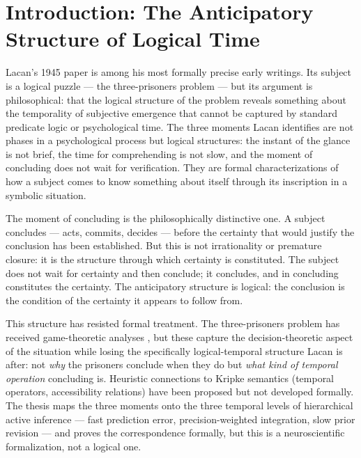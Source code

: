\documentclass[12pt]{article}
\theoremstyle{definition}
\theoremstyle{remark}
\begin{document}
\vspace{1em}

\section{Introduction: The Anticipatory Structure of Logical Time}

Lacan's 1945 paper is among his most formally precise early writings. Its subject is a logical puzzle --- the three-prisoners problem --- but its argument is philosophical: that the logical structure of the problem reveals something about the temporality of subjective emergence that cannot be captured by standard predicate logic or psychological time. The three moments Lacan identifies are not phases in a psychological process but logical structures: the instant of the glance is not brief, the time for comprehending is not slow, and the moment of concluding does not wait for verification. They are formal characterizations of how a subject comes to know something about itself through its inscription in a symbolic situation.

The moment of concluding is the philosophically distinctive one. A subject concludes --- acts, commits, decides --- before the certainty that would justify the conclusion has been established. But this is not irrationality or premature closure: it is the structure through which certainty is constituted. The subject does not wait for certainty and then conclude; it concludes, and in concluding constitutes the certainty. The anticipatory structure is logical: the conclusion is the condition of the certainty it appears to follow from.

This structure has resisted formal treatment. The three-prisoners problem has received game-theoretic analyses \cite{skrbina2001}, but these capture the decision-theoretic aspect of the situation while losing the specifically logical-temporal structure Lacan is after: not \emph{why} the prisoners conclude when they do but \emph{what kind of temporal operation} concluding is. Heuristic connections to Kripke semantics (temporal operators, accessibility relations) have been proposed but not developed formally. The thesis \cite{papathanasiou2026b} maps the three moments onto the three temporal levels of hierarchical active inference --- fast prediction error, precision-weighted integration, slow prior revision --- and proves the correspondence formally, but this is a neuroscientific formalization, not a logical one.
\end{document}
